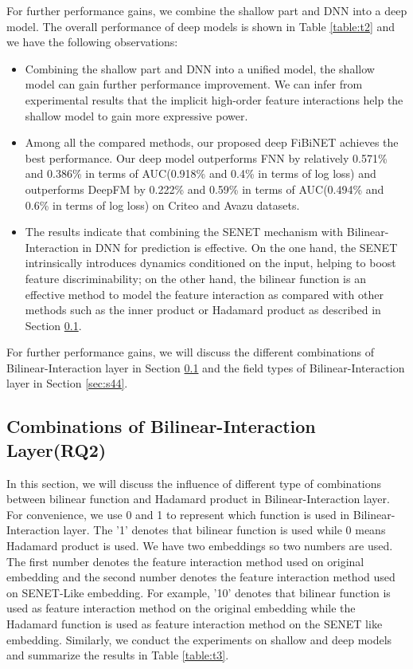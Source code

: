 \documentclass[sigconf]{acmart}
\begin{document}
For further performance gains, we combine the shallow part and DNN into
a deep model. The overall performance of deep models is shown in Table \ref{table:t2} and we have the following observations:

\begin{itemize}
\item
  Combining the shallow part and DNN into a unified model, the shallow
  model can gain further performance improvement. We can infer from experimental results that the implicit high-order feature interactions help the shallow model to gain
  more expressive power.
\item
  Among all the compared methods, our proposed deep FiBiNET achieves the best performance. Our deep model outperforms FNN by relatively 0.571\% and 0.386\% in terms of AUC(0.918\% and 0.4\% in terms of log loss) and outperforms DeepFM by 0.222\%
  and 0.59\% in terms of AUC(0.494\% and 0.6\% in terms of log loss) on Criteo and Avazu datasets.
\item
  The results indicate that combining the SENET mechanism with Bilinear-Interaction in DNN for prediction is effective. On the one hand, the SENET intrinsically introduces dynamics conditioned on the input, helping to boost feature discriminability; on the other hand, the
  bilinear function is an effective method to model the feature interaction as compared with other methods such as the inner product or Hadamard product as described in Section \ref{sec:s43}.
\end{itemize}

For further performance gains, we will discuss the different combinations
of Bilinear-Interaction layer in Section \ref{sec:s43} and the field types of
Bilinear-Interaction layer in Section \ref{sec:s44}.

\subsection{Combinations of Bilinear-Interaction Layer(RQ2)}
\label{sec:s43}
In this section, we will discuss the influence of different type of combinations between bilinear function and Hadamard product in Bilinear-Interaction layer. For convenience, we use 0 and 1 to represent which function is used in Bilinear-Interaction layer. The '1' denotes that bilinear function is used while 0 means Hadamard product is used. We have two embeddings so two numbers are used. The first number denotes the feature interaction method used on original embedding and the second number denotes the feature interaction method used on SENET-Like embedding. For example, '10' denotes that bilinear function is used as feature interaction method on the original embedding while the Hadamard function is used as feature interaction method on the SENET like embedding. Similarly, we conduct the experiments on shallow and deep models and summarize the results in Table \ref{table:t3}.
\end{document}
